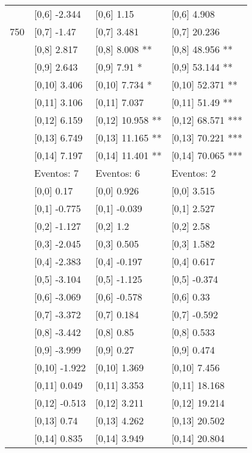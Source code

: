 \begin{table}
\begin{tabular}[t]{llll}
 & {}[0,6] -2.344 & {}[0,6] 1.15 & {}[0,6] 4.908\\
750 & {}[0,7] -1.47 & {}[0,7] 3.481 & {}[0,7] 20.236\\
\addlinespace
 & {}[0,8] 2.817 & {}[0,8] 8.008 ** & {}[0,8] 48.956 **\\
 & {}[0,9] 2.643 & {}[0,9] 7.91 * & {}[0,9] 53.144 **\\
 & {}[0,10] 3.406 & {}[0,10] 7.734 * & {}[0,10] 52.371 **\\
 & {}[0,11] 3.106 & {}[0,11] 7.037 & {}[0,11] 51.49 **\\
 & {}[0,12] 6.159 & {}[0,12] 10.958 ** & {}[0,12] 68.571 ***\\
\addlinespace
 & {}[0,13] 6.749 & {}[0,13] 11.165 ** & {}[0,13] 70.221 ***\\
 & {}[0,14] 7.197 & {}[0,14] 11.401 ** & {}[0,14] 70.065 ***\\
 & Eventos:  7 & Eventos:  6 & Eventos:  2\\
 & {}[0,0] 0.17 & {}[0,0] 0.926 & {}[0,0] 3.515\\
 & {}[0,1] -0.775 & {}[0,1] -0.039 & {}[0,1] 2.527\\
\addlinespace
 & {}[0,2] -1.127 & {}[0,2] 1.2 & {}[0,2] 2.58\\
 & {}[0,3] -2.045 & {}[0,3] 0.505 & {}[0,3] 1.582\\
 & {}[0,4] -2.383 & {}[0,4] -0.197 & {}[0,4] 0.617\\
 & {}[0,5] -3.104 & {}[0,5] -1.125 & {}[0,5] -0.374\\
 & {}[0,6] -3.069 & {}[0,6] -0.578 & {}[0,6] 0.33\\
\addlinespace
1000 & {}[0,7] -3.372 & {}[0,7] 0.184 & {}[0,7] -0.592\\
 & {}[0,8] -3.442 & {}[0,8] 0.85 & {}[0,8] 0.533\\
 & {}[0,9] -3.999 & {}[0,9] 0.27 & {}[0,9] 0.474\\
 & {}[0,10] -1.922 & {}[0,10] 1.369 & {}[0,10] 7.456\\
 & {}[0,11] 0.049 & {}[0,11] 3.353 & {}[0,11] 18.168\\
\addlinespace
 & {}[0,12] -0.513 & {}[0,12] 3.211 & {}[0,12] 19.214\\
 & {}[0,13] 0.74 & {}[0,13] 4.262 & {}[0,13] 20.502\\
 & {}[0,14] 0.835 & {}[0,14] 3.949 & {}[0,14] 20.804\\
\bottomrule
\end{tabular}
\end{table}
